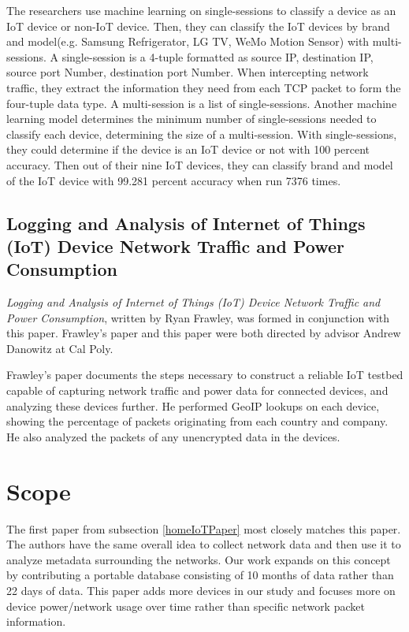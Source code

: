 The researchers use machine learning on single-sessions to classify a device as an IoT device or non-IoT device. Then, they can classify the IoT devices by brand and model(e.g. Samsung Refrigerator, LG TV, WeMo Motion Sensor) with multi-sessions. A single-session is a 4-tuple formatted as source IP, destination IP, source port Number, destination port Number. When intercepting network traffic, they extract the information they need from each TCP packet to form the four-tuple data type. A multi-session is a list of single-sessions. Another machine learning model determines the minimum number of single-sessions needed to classify each device, determining the size of a multi-session. With single-sessions, they could determine if the device is an IoT device or not with 100 percent accuracy. Then out of their nine IoT devices, they can classify brand and model of the IoT device with 99.281 percent accuracy when run 7376 times.

\subsection{Logging and Analysis of Internet of Things (IoT) Device Network Traffic and Power Consumption}
\label{frawleyPaper}
\textit{Logging and Analysis of Internet of Things (IoT) Device Network Traffic and Power Consumption}\cite{frawley_2018}, written by Ryan Frawley, was formed in conjunction with this paper. Frawley's paper and this paper were both directed by advisor Andrew Danowitz at Cal Poly.

Frawley's paper documents the steps necessary to construct a reliable IoT testbed capable of capturing network traffic and power data for connected devices, and analyzing these devices further. He performed GeoIP\cite{maxmind} lookups on each device, showing the percentage of packets originating from each country and company. He also analyzed the packets of any unencrypted data in the devices.

\section{Scope}
\label{Scope}
The first paper from subsection \ref{homeIoTPaper} most closely matches this paper. The authors have the same overall idea to collect network data and then use it to analyze metadata surrounding the networks. Our work expands on this concept by contributing a portable database consisting of 10 months of data rather than 22 days of data. This paper adds more devices in our study and focuses more on device power/network usage over time rather than specific network packet information.

